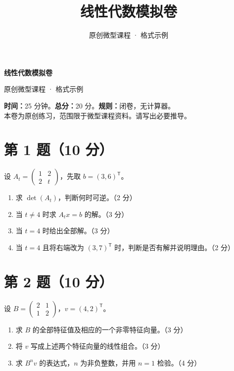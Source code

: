 \documentclass[UTF8,fontset=fandol,zihao=-4]{ctexart}
\author{原创微型课程 · 格式示例}
\date{}
\title{线性代数模拟卷}
\begin{document}
\begin{center}{\LARGE\bfseries 线性代数模拟卷\par}\vspace{0.6em}原创微型课程 · 格式示例\end{center}
\vspace{0.5em}
\textbf{时间：}25 分钟。\quad \textbf{总分：}20 分。\quad \textbf{规则：}闭卷，无计算器。\\
本卷为原创练习，范围限于微型课程资料。请写出必要推导。
\section*{第 1 题（10 分）}
设 $A_t=\begin{pmatrix}1&2\\2&t\end{pmatrix}$，先取 $b=(3,6)^{\mathsf T}$。
\begin{enumerate}[label=(\arabic*)]
\item 求 $\det(A_t)$，判断何时可逆。（2 分）
\item 当 $t\ne4$ 时求 $A_t x=b$ 的解。（3 分）
\item 当 $t=4$ 时给出全部解。（3 分）
\item 当 $t=4$ 且将右端改为 $(3,7)^{\mathsf T}$ 时，判断是否有解并说明理由。（2 分）
\end{enumerate}
\vfill\newpage
\section*{第 2 题（10 分）}
设 $B=\begin{pmatrix}2&1\\1&2\end{pmatrix}$，$v=(4,2)^{\mathsf T}$。
\begin{enumerate}[label=(\arabic*)]
\item 求 $B$ 的全部特征值及相应的一个非零特征向量。（3 分）
\item 将 $v$ 写成上述两个特征向量的线性组合。（3 分）
\item 求 $B^n v$ 的表达式，$n$ 为非负整数，并用 $n=1$ 检验。（4 分）
\end{enumerate}
\vspace*{8cm}
\end{document}
